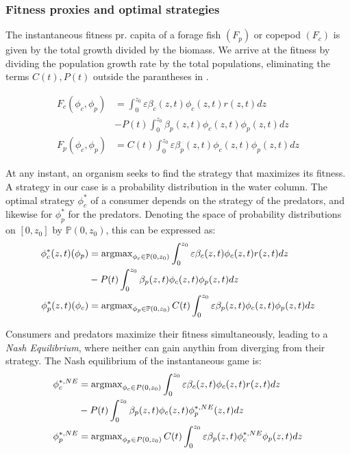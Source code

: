 \subsubsection*{Fitness proxies and optimal strategies}


The instantaneous fitness pr. capita of a forage fish $(F_p)$ or copepod $(F_c)$ is given by the total growth divided by the biomass. We arrive at the fitness by dividing the population growth rate  by the total populations, eliminating the terms $C(t), P(t)$ outside the parantheses in .

\begin{align}
	F_c(\phi_c, \phi_p) &= \int_0^{z_0} \varepsilon \beta_c(z,t)\phi_c(z,t)r(z,t) dz\\ &- P(t)\int_0^{z_0} \beta_p(z,t) \phi_c(z,t) \phi_p(z,t)dz \\
	F_p(\phi_c, \phi_p) &=  C(t) \int_0^{z_0} \varepsilon \beta_p(z,t)\phi_c(z,t)\phi_p(z,t) dz
  \label{eq:fitness}
\end{align}

At any instant, an organism seeks to find the strategy that maximizes its fitness. A strategy in our case is a probability distribution in the water column. The optimal strategy $\phi_c^*$ of a consumer depends on the strategy of the predators, and likewise for $\phi_p^*$ for the predators. Denoting the space of probability distributions on $[0,z_0]$ by $\mathbb{P}(0,z_0)$, this can be expressed as:
\begin{align*}
	\phi_c^*(z,t)(\phi_p) &= \argmax_{\phi_c \in \mathbb{P}(0,z_0)}  \int_0^{z_0} \varepsilon \beta_c(z,t)\phi_c(z,t)r(z,t) dz \\ &- P(t)\int_0^{z_0} \beta_p(z,t) \phi_c(z,t) \phi_p(z,t)dz  \\
	\phi_p^*(z,t)(\phi_c) &= \argmax_{\phi_p \in \mathbb{P}(0,z_0)}C(t) \int_0^{z_0} \varepsilon \beta_p(z,t)\phi_c(z,t)\phi_p(z,t) dz
\end{align*}

Consumers and predators maximize their fitness simultaneously, leading to a \emph{Nash Equilibrium}, where neither can gain anythin from diverging from their strategy. The Nash equilibrium of the instantaneous game is:
\begin{align}
  \label{eq:nash_equilibria}
	\phi_c^{*,NE} &=  \argmax_{\phi_c \in P(0,z_0)}  \int_0^{z_0} \varepsilon \beta_c(z,t)\phi_c(z,t)r(z,t) dz \\ &- P(t)\int_0^{z_0} \beta_p(z,t) \phi_c(z,t) \phi_p^{*,NE}(z,t) dz \\
	\phi_p^{*,NE} &=  \argmax_{\phi_p \in P(0,z_0)}C(t) \int_0^{z_0} \varepsilon \beta_p(z,t)\phi_c^{*,NE} \phi_p(z,t) dz
\end{align}

